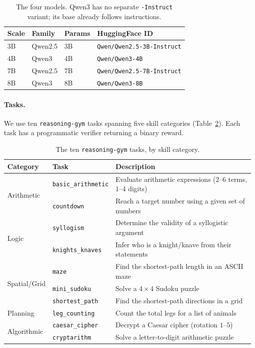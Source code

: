 \documentclass{article}
\begin{document}
\begin{table}[h]
\centering\small
\caption{The four models. Qwen3 has no separate \texttt{-Instruct} variant; its base already
follows instructions.}
\label{tab:models}
\begin{tabular}{llll}
\toprule
Scale & Family & Params & HuggingFace ID\\
\midrule
3B & Qwen2.5 & 3B & \texttt{Qwen/Qwen2.5-3B-Instruct}\\
4B & Qwen3   & 4B & \texttt{Qwen/Qwen3-4B}\\
7B & Qwen2.5 & 7B & \texttt{Qwen/Qwen2.5-7B-Instruct}\\
8B & Qwen3   & 8B & \texttt{Qwen/Qwen3-8B}\\
\bottomrule
\end{tabular}
\end{table}

\paragraph{Tasks.} We use ten \texttt{reasoning-gym} \citep{reasoninggym2025} tasks spanning five
skill categories (Table~\ref{tab:tasks}). Each task has a programmatic verifier returning a binary
reward.

\begin{table}[h]
\centering\small
\caption{The ten \texttt{reasoning-gym} tasks, by skill category.}
\label{tab:tasks}
\begin{tabular}{lll}
\toprule
Category & Task & Description\\
\midrule
\multirow{2}{*}{Arithmetic}   & \texttt{basic\_arithmetic} & Evaluate arithmetic expressions ($2$--$6$ terms, $1$--$4$ digits)\\
                              & \texttt{countdown}         & Reach a target number using a given set of numbers\\
\midrule
\multirow{2}{*}{Logic}        & \texttt{syllogism}         & Determine the validity of a syllogistic argument\\
                              & \texttt{knights\_knaves}   & Infer who is a knight/knave from their statements\\
\midrule
\multirow{3}{*}{Spatial/Grid} & \texttt{maze}              & Find the shortest-path length in an ASCII maze\\
                              & \texttt{mini\_sudoku}      & Solve a $4{\times}4$ Sudoku puzzle\\
                              & \texttt{shortest\_path}    & Find the shortest-path directions in a grid\\
\midrule
Planning                      & \texttt{leg\_counting}     & Count the total legs for a list of animals\\
\midrule
\multirow{2}{*}{Algorithmic}  & \texttt{caesar\_cipher}    & Decrypt a Caesar cipher (rotation $1$--$5$)\\
                              & \texttt{cryptarithm}       & Solve a letter-to-digit arithmetic puzzle\\
\bottomrule
\end{tabular}
\end{table}
\end{document}
